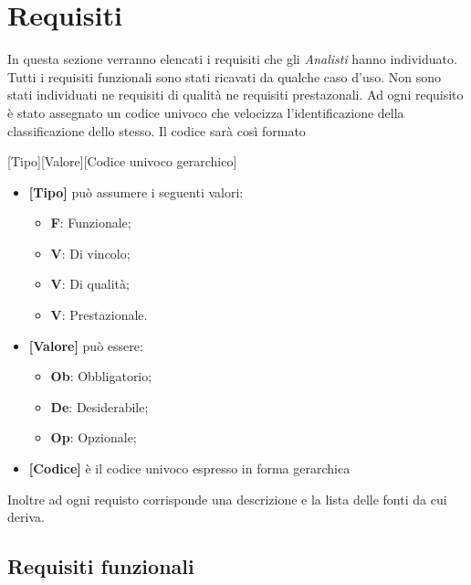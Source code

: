 \section{Requisiti}
In questa sezione verranno elencati i requisiti che gli \textit{Analisti} hanno individuato. 
Tutti i requisiti funzionali sono stati ricavati da qualche caso d'uso.
Non sono stati individuati ne requisiti di qualità ne requisiti prestazonali.
Ad ogni requisito è stato assegnato un codice univoco che velocizza l'identificazione della classificazione dello stesso.
Il codice sarà così formato
\begin{center}
[Tipo][Valore][Codice univoco gerarchico]
\end{center}
\begin{itemize}
\item \textbf{[Tipo]} può assumere i seguenti valori:
\begin{itemize}
	\item \textbf{F}: Funzionale;
	\item \textbf{V}: Di vincolo;
	\item \textbf{V}: Di qualità;
	\item \textbf{V}: Prestazionale.
\end{itemize}
\item \textbf{[Valore]} può essere:
\begin{itemize}
	\item \textbf{Ob}: Obbligatorio;
	\item \textbf{De}: Desiderabile;
	\item \textbf{Op}: Opzionale;
\end{itemize}
\item \textbf{[Codice]} è il codice univoco espresso in forma gerarchica
\end{itemize}
Inoltre ad ogni requisto corrisponde una descrizione e la lista delle fonti da cui deriva.
\subsection{ Requisiti funzionali}
	
